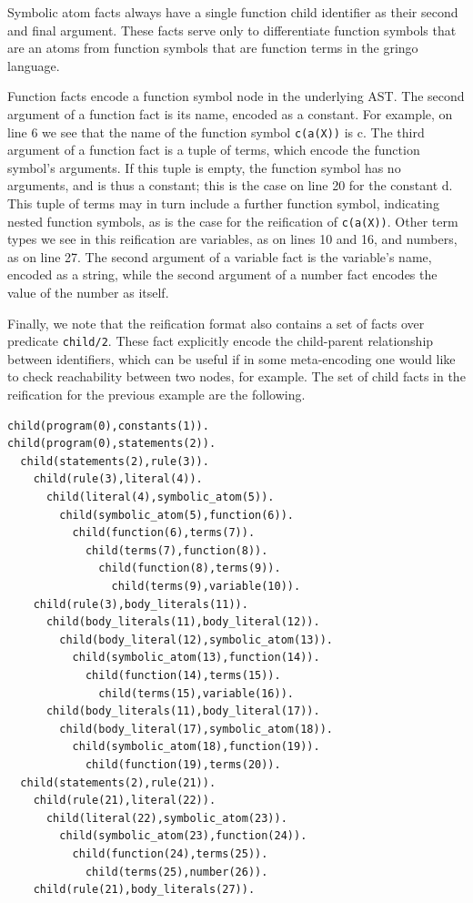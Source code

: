 Symbolic atom facts always have a single function child identifier as
their second and final argument. These facts serve only to
differentiate function symbols that are an atoms from function symbols
that are function terms in the gringo language.

Function facts encode a function symbol node in the underlying
AST. The second argument of a function fact is its name, encoded as a
constant. For example, on line 6 we see that the name of the function
symbol \texttt{c(a(X))} is c. The third argument of a function fact is
a tuple of terms, which encode the function symbol's arguments. If
this tuple is empty, the function symbol has no arguments, and is thus
a constant; this is the case on line 20 for the constant d. This tuple
of terms may in turn include a further function symbol, indicating
nested function symbols, as is the case for the reification of
\texttt{c(a(X))}. Other term types we see in this reification are
variables, as on lines 10 and 16, and numbers, as on line 27. The
second argument of a variable fact is the variable's name, encoded as
a string, while the second argument of a number fact encodes the value
of the number as itself.

Finally, we note that the reification format also contains a set of
facts over predicate \texttt{child/2}. These fact explicitly encode
the child-parent relationship between identifiers, which can be useful
if in some meta-encoding one would like to check reachability between
two nodes, for example. The set of child facts in the reification for
the previous example are the following.

\begin{lstlisting}[language=clingo]
child(program(0),constants(1)).
child(program(0),statements(2)).
  child(statements(2),rule(3)).
    child(rule(3),literal(4)).
      child(literal(4),symbolic_atom(5)).
        child(symbolic_atom(5),function(6)).
          child(function(6),terms(7)).
            child(terms(7),function(8)).
              child(function(8),terms(9)).
                child(terms(9),variable(10)).
    child(rule(3),body_literals(11)).
      child(body_literals(11),body_literal(12)).
        child(body_literal(12),symbolic_atom(13)).
          child(symbolic_atom(13),function(14)).
            child(function(14),terms(15)).
              child(terms(15),variable(16)).
      child(body_literals(11),body_literal(17)).
        child(body_literal(17),symbolic_atom(18)).
          child(symbolic_atom(18),function(19)).
            child(function(19),terms(20)).
  child(statements(2),rule(21)).
    child(rule(21),literal(22)).
      child(literal(22),symbolic_atom(23)).
        child(symbolic_atom(23),function(24)).
          child(function(24),terms(25)).
            child(terms(25),number(26)).
    child(rule(21),body_literals(27)).
\end{lstlisting}

